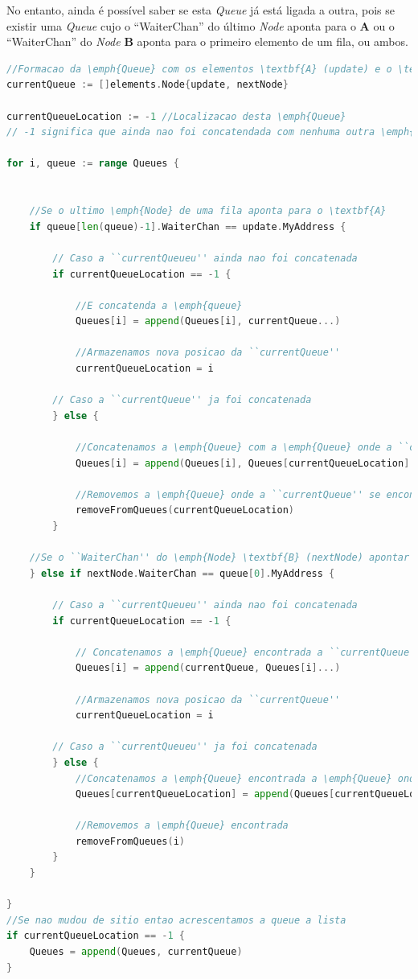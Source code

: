 No entanto, ainda é possível saber se esta \emph{Queue} já está ligada a outra, pois se existir uma \emph{Queue} cujo o ``WaiterChan'' do último \emph{Node} aponta para o \textbf{A} ou o ``WaiterChan'' do \emph{Node} \textbf{B} aponta para o primeiro elemento de um fila, ou ambos.



\begin{lstlisting}[caption={Alterações nas filas caso o \emph{Node} seja do tipo ``Waiter With Request'' nem o \textbf{A} nem o \textbf{B} estão em filas. },language=Go]
//Formacao da \emph{Queue} com os elementos \textbf{A} (update) e o \textbf{B} (nextNode)
currentQueue := []elements.Node{update, nextNode}

currentQueueLocation := -1 //Localizacao desta \emph{Queue}
// -1 significa que ainda nao foi concatendada com nenhuma outra \emph{Queue}

for i, queue := range Queues {


	//Se o ultimo \emph{Node} de uma fila aponta para o \textbf{A}
	if queue[len(queue)-1].WaiterChan == update.MyAddress {

		// Caso a ``currentQueueu'' ainda nao foi concatenada
		if currentQueueLocation == -1 {

			//E concatenda a \emph{queue} 
			Queues[i] = append(Queues[i], currentQueue...)

			//Armazenamos nova posicao da ``currentQueue''
			currentQueueLocation = i

		// Caso a ``currentQueue'' ja foi concatenada
		} else {

			//Concatenamos a \emph{Queue} com a \emph{Queue} onde a ``currentQueue'' se encontra
			Queues[i] = append(Queues[i], Queues[currentQueueLocation]...)

			//Removemos a \emph{Queue} onde a ``currentQueue'' se encontra
			removeFromQueues(currentQueueLocation)
		}

	//Se o ``WaiterChan'' do \emph{Node} \textbf{B} (nextNode) apontar para o primeiro de uma \emph{Queue}
	} else if nextNode.WaiterChan == queue[0].MyAddress {

		// Caso a ``currentQueueu'' ainda nao foi concatenada
		if currentQueueLocation == -1 {

			// Concatenamos a \emph{Queue} encontrada a ``currentQueue'', que passa a estar na mesma posicao (substitui)
			Queues[i] = append(currentQueue, Queues[i]...)

			//Armazenamos nova posicao da ``currentQueue''
			currentQueueLocation = i

		// Caso a ``currentQueueu'' ja foi concatenada
		} else {
			//Concatenamos a \emph{Queue} encontrada a \emph{Queue} onde a ``currentQueue'' se encontra
			Queues[currentQueueLocation] = append(Queues[currentQueueLocation], Queues[i]...)

			//Removemos a \emph{Queue} encontrada
			removeFromQueues(i)
		}
	}

}
//Se nao mudou de sitio entao acrescentamos a queue a lista 
if currentQueueLocation == -1 {
	Queues = append(Queues, currentQueue)
}


\end{lstlisting}




